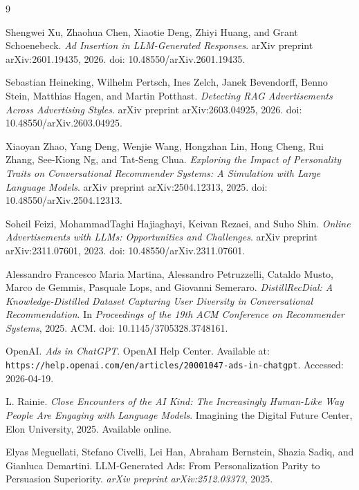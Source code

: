 \documentclass{article}
\begin{document}
\newpage

\begin{thebibliography}{9}

Shengwei Xu, Zhaohua Chen, Xiaotie Deng, Zhiyi Huang, and Grant Schoenebeck.
\textit{Ad Insertion in LLM-Generated Responses}.
arXiv preprint arXiv:2601.19435, 2026.
doi: 10.48550/arXiv.2601.19435.

Sebastian Heineking, Wilhelm Pertsch, Ines Zelch, Janek Bevendorff, Benno Stein, Matthias Hagen, and Martin Potthast.
\textit{Detecting RAG Advertisements Across Advertising Styles}.
arXiv preprint arXiv:2603.04925, 2026.
doi: 10.48550/arXiv.2603.04925.

Xiaoyan Zhao, Yang Deng, Wenjie Wang, Hongzhan Lin, Hong Cheng, Rui Zhang, See-Kiong Ng, and Tat-Seng Chua.
\textit{Exploring the Impact of Personality Traits on Conversational Recommender Systems: A Simulation with Large Language Models}.
arXiv preprint arXiv:2504.12313, 2025.
doi: 10.48550/arXiv.2504.12313.

Soheil Feizi, MohammadTaghi Hajiaghayi, Keivan Rezaei, and Suho Shin.
\textit{Online Advertisements with LLMs: Opportunities and Challenges}.
arXiv preprint arXiv:2311.07601, 2023.
doi: 10.48550/arXiv.2311.07601.

Alessandro Francesco Maria Martina, Alessandro Petruzzelli, Cataldo Musto, Marco de Gemmis, Pasquale Lops, and Giovanni Semeraro.
\textit{DistillRecDial: A Knowledge-Distilled Dataset Capturing User Diversity in Conversational Recommendation}.
In \textit{Proceedings of the 19th ACM Conference on Recommender Systems}, 2025.
ACM.
doi: 10.1145/3705328.3748161.

OpenAI. \emph{Ads in ChatGPT}. OpenAI Help Center. Available at:
\texttt{https://help.openai.com/en/articles/20001047-ads-in-chatgpt}.
Accessed: 2026-04-19.

L. Rainie.
\newblock \textit{Close Encounters of the AI Kind: The Increasingly Human-Like Way People Are Engaging with Language Models}.
\newblock Imagining the Digital Future Center, Elon University, 2025.
\newblock Available online.

Elyas Meguellati, Stefano Civelli, Lei Han, Abraham Bernstein, 
Shazia Sadiq, and Gianluca Demartini.
\newblock LLM-Generated Ads: From Personalization Parity to Persuasion Superiority.
\newblock \emph{arXiv preprint arXiv:2512.03373}, 2025.


\end{thebibliography}
\end{document}
